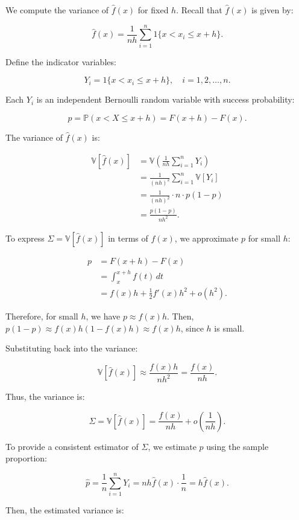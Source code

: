 \documentclass{article}
\begin{document}
We compute the variance of \( \hat{f}(x) \) for fixed \( h \). Recall that \( \hat{f}(x) \) is given by:

\[
\hat{f}(x) = \frac{1}{n h} \sum_{i=1}^n 1\{ x < x_i \leq x + h \}.
\]

Define the indicator variables:

\[
Y_i = 1\{ x < x_i \leq x + h \}, \quad i = 1, 2, \dots, n.
\]

Each \( Y_i \) is an independent Bernoulli random variable with success probability:

\[
p = \mathbb{P}(x < X \leq x + h) = F(x + h) - F(x).
\]

The variance of \( \hat{f}(x) \) is:

\[
\begin{aligned}
\mathbb{V}[\hat{f}(x)] &= \mathbb{V}\left( \frac{1}{n h} \sum_{i=1}^n Y_i \right) \\
&= \frac{1}{(n h)^2} \sum_{i=1}^n \mathbb{V}[Y_i] \\
&= \frac{1}{(n h)^2} \cdot n \cdot p (1 - p) \\
&= \frac{p (1 - p)}{n h^2}.
\end{aligned}
\]

To express \( \Sigma = \mathbb{V}[\hat{f}(x)] \) in terms of \( f(x) \), we approximate \( p \) for small \( h \):

\[
\begin{aligned}
p &= F(x + h) - F(x) \\
&= \int_x^{x + h} f(t) \, dt \\
&= f(x) h + \frac{1}{2} f'(x) h^2 + o(h^2).
\end{aligned}
\]

Therefore, for small \( h \), we have \( p \approx f(x) h \). Then, \( p (1 - p) \approx f(x) h (1 - f(x) h) \approx f(x) h \), since \( h \) is small.

Substituting back into the variance:

\[
\mathbb{V}[\hat{f}(x)] \approx \frac{f(x) h}{n h^2} = \frac{f(x)}{n h}.
\]

Thus, the variance is:

\[
\Sigma = \mathbb{V}[\hat{f}(x)] = \frac{f(x)}{n h} + o\left( \frac{1}{n h} \right).
\]

To provide a consistent estimator of \( \Sigma \), we estimate \( p \) using the sample proportion:

\[
\hat{p} = \frac{1}{n} \sum_{i=1}^n Y_i = n h \hat{f}(x) \cdot \frac{1}{n} = h \hat{f}(x).
\]

Then, the estimated variance is:
\end{document}
